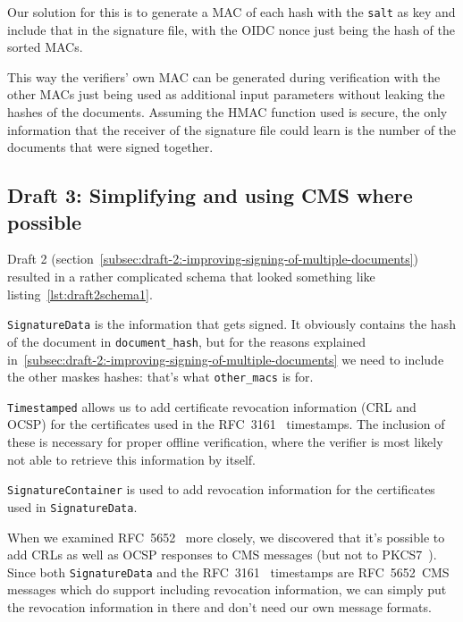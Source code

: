 Our solution for this is to generate a \gls{MAC} of each hash with the \texttt{salt} as key and include that in the signature file,
with the \gls{OIDC} nonce just being the hash of the sorted \gls{MAC}s.

This way the verifiers' own \gls{MAC} can be generated during verification with the other \gls{MAC}s just being used as additional input parameters without leaking the hashes of the documents.
Assuming the \gls{HMAC} function used is secure,
the only information that the receiver of the signature file could learn is the number of the documents that were signed together.

\subsection{Draft 3: Simplifying and using CMS where possible}\label{subsec:draft-3:-simplifying-and-using-cms-where-possible}
Draft 2 (section~\ref{subsec:draft-2:-improving-signing-of-multiple-documents})
resulted in a rather complicated schema that looked something like listing~\ref{lst:draft2schema1}.



\texttt{SignatureData} is the information that gets signed.
It obviously contains the hash of the document in \texttt{document\_hash},
but for the reasons explained in~\ref{subsec:draft-2:-improving-signing-of-multiple-documents}
we need to include the other maskes hashes: that's what \texttt{other\_macs} is for.

\texttt{Timestamped} allows us to add certificate revocation information (\gls{CRL} and \gls{OCSP}) for the certificates used in the RFC~3161~\cite{rfc3161} timestamps.
The inclusion of these is necessary for proper offline verification, where the verifier is most likely not able to retrieve this information by itself.

\texttt{SignatureContainer} is used to add revocation information for the certificates used in \texttt{SignatureData}.

When we examined RFC~5652~\cite{rfc5652} more closely, we discovered that it's possible to add
\gls{CRL}s as well as \gls{OCSP} responses to \gls{CMS} messages (but not to \gls{PKCS7}~\cite[Section 10.2.1, RevocationInfoChoices and OtherRevocationInfoFormat]{rfc5652}).
Since both \texttt{SignatureData} and the RFC~3161~\cite{rfc3161} timestamps are RFC~5652~\gls{CMS} messages which do support including revocation information,
we can simply put the revocation information in there and don't need our own message formats.

